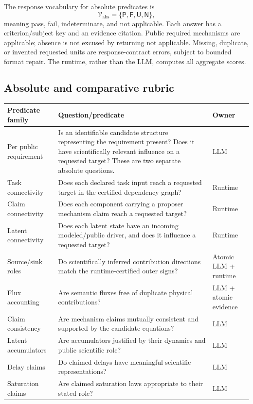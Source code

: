 \documentclass[11pt]{article}
\newcommand{\PASS}{\mathsf{P}}
\newcommand{\FAIL}{\mathsf{F}}
\newcommand{\UNK}{\mathsf{U}}
\newcommand{\NA}{\mathsf{N}}
\begin{document}
The response vocabulary for absolute predicates is
\begin{equation}
 \mathcal V_{\mathrm{abs}}=\{\PASS,\FAIL,\UNK,\NA\},
\end{equation}
meaning pass, fail, indeterminate, and not applicable. Each answer has a
criterion/subject key and an evidence citation. Public required mechanisms are
applicable; absence is not excused by returning not applicable. Missing, duplicate,
or invented requested units are response-contract errors, subject to bounded
format repair. The runtime, rather than the LLM, computes all aggregate scores.

\subsection{Absolute and comparative rubric}
\begin{longtable}{>{\raggedright\arraybackslash}p{}
  >{\raggedright\arraybackslash}p{}
  >{\raggedright\arraybackslash}p{}}
\toprule
Predicate family & Question/predicate & Owner\\
\midrule
\endhead
Per public requirement & Is an identifiable candidate structure representing the
requirement present? Does it have scientifically relevant influence on a requested
target? These are two separate absolute questions. & LLM\\
Task connectivity & Does each declared task input reach a requested target in the
certified dependency graph? & Runtime\\
Claim connectivity & Does each component carrying a proposer mechanism claim reach
a requested target? & Runtime\\
Latent connectivity & Does each latent state have an incoming modeled/public
driver, and does it influence a requested target? & Runtime\\
Source/sink roles & Do scientifically inferred contribution directions match
the runtime-certified outer signs? & Atomic LLM + runtime\\
Flux accounting & Are semantic fluxes free of duplicate physical contributions? & LLM + atomic evidence\\
Claim consistency & Are mechanism claims mutually consistent and supported by
the candidate equations? & LLM\\
Latent accumulators & Are accumulators justified by their dynamics and public
scientific role? & LLM\\
Delay claims & Do claimed delays have meaningful scientific representations? & LLM\\
Saturation claims & Are claimed saturation laws appropriate to their stated role? & LLM\\
\bottomrule
\end{longtable}
\end{document}
